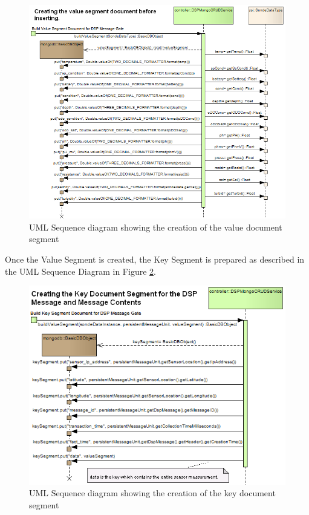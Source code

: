 \begin{figure}[!h]
  \centering
  \includegraphics[scale=0.6]{../diagrams/From-Creating-Value-Segment-Sequence}
  \caption{UML Sequence diagram showing the creation of the value document segment}
  \label{fig:From-Creating-Value-Segment-Sequence}
\end{figure}

\newpage

Once the Value Segment is created, the Key Segment is prepared as described in
the UML Sequence Diagram in Figure
\ref{fig:From-Creating-Key-Segment-Sequence}.

\begin{figure}[!h]
  \centering
  \includegraphics[scale=0.65]{../diagrams/From-Creating-Key-Segment-Sequence}
  \caption{UML Sequence diagram showing the creation of the key document segment}
  \label{fig:From-Creating-Key-Segment-Sequence}
\end{figure}


